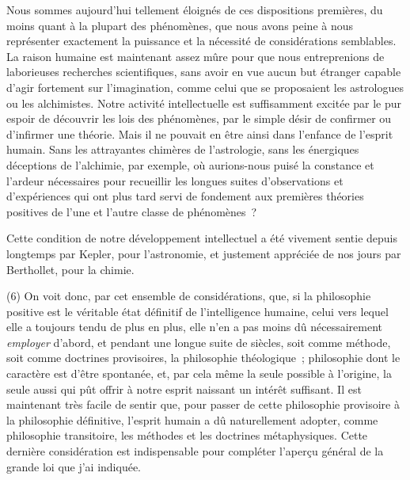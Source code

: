 \documentclass[french,twoside]{book} %
\begin{document}
Nous sommes aujourd’hui tellement éloignés de ces dispositions premières, du moins quant à la plupart des phénomènes, que nous avons peine à nous représenter exactement la puissance et la nécessité de considérations semblables. La raison humaine est maintenant assez mûre pour que nous entreprenions de laborieuses recherches scientifiques, sans avoir en vue aucun but étranger capable d’agir fortement sur l’imagination, comme celui que se proposaient les astrologues ou les alchimistes. Notre activité intellectuelle est suffisamment excitée par le pur espoir de découvrir les lois des phénomènes, par le simple désir de confirmer ou d’infirmer une théorie. Mais il ne pouvait en être ainsi dans l’enfance de l’esprit humain. Sans les attrayantes chimères de l’astrologie, sans les énergiques déceptions de l’alchimie, par exemple, où aurions-nous puisé la constance et l’ardeur nécessaires pour recueillir les longues suites d’observations et d’expériences qui ont plus tard servi de fondement aux premières théories positives de l’une et l’autre classe de phénomènes ?\par
Cette condition de notre développement intellectuel a été vivement sentie depuis longtemps par Kepler, pour l’astronomie, et justement appréciée de nos jours par Berthollet, pour la chimie.\par
(6) On voit donc, par cet ensemble de considérations, que, si la philosophie positive est le véritable état définitif de l’intelligence humaine, celui vers lequel elle a toujours tendu de plus en plus, elle n’en a pas moins dû nécessairement {\itshape employer} d’abord, et pendant une longue suite de siècles, soit comme méthode, soit comme doctrines provisoires, la philosophie théologique ; philosophie dont le caractère est d’être spontanée, et, par cela même la seule possible à l’origine, la seule aussi qui pût offrir à notre esprit naissant un intérêt suffisant. Il est maintenant très facile de sentir que, pour passer de cette philosophie provisoire à la philosophie définitive, l’esprit humain a dû naturellement adopter, comme philosophie transitoire, les méthodes et les doctrines métaphysiques. Cette dernière considération est indispensable pour compléter l’aperçu général de la grande loi que j’ai indiquée.\par
\end{document}
